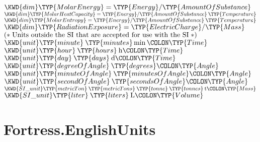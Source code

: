 \begin{Fortress}
\( \KWD{dim} \TYP{MolarEnergy} = \TYP{Energy} / \TYP{AmountOfSubstance}\)\\
\( \KWD{dim} \TYP{MolarHeatCapacity} = \TYP{Energy} / \TYP{AmountOfSubstance}\mskip 4mu plus 4mu\TYP{Temperature}\)\\
\( \KWD{dim} \TYP{MolarEntropy} = \TYP{Energy} / \TYP{AmountOfSubstance}\mskip 4mu plus 4mu\TYP{Temperature}\)\\
\( \KWD{dim} \TYP{RadiationExposure} = \TYP{ElectricCharge} / \TYP{Mass}\)\\[4pt]
\( \mathtt{(*}\;\hbox{\rm  Units outside the SI that are accepted for use with the SI \unskip}\;\mathtt{*)}\)\\[4pt]
\( \KWD{unit} \TYP{minute}\mskip 4mu plus 4mu\TYP{minutes} \min\COLON \TYP{Time} \)\\
\( \KWD{unit} \TYP{hour}\mskip 4mu plus 4mu\TYP{hours}\mskip 4mu plus 4mu\mathrm{h}\COLON \TYP{Time} \)\\
\( \KWD{unit} \TYP{day}\mskip 4mu plus 4mu\TYP{days}\mskip 4mu plus 4mu\mathrm{d}\COLON \TYP{Time} \)\\
\( \KWD{unit} \TYP{degreeOfAngle}\mskip 4mu plus 4mu\TYP{degrees}\COLON \TYP{Angle}  \)\\
\( \KWD{unit} \TYP{minuteOfAngle}\mskip 4mu plus 4mu\TYP{minutesOfAngle}\COLON \TYP{Angle} \)\\
\( \KWD{unit} \TYP{secondOfAngle}\mskip 4mu plus 4mu\TYP{secondsOfAngle}\COLON \TYP{Angle} \)\\
\( \KWD{SI{\char'137}unit} \TYP{metricTon}\mskip 4mu plus 4mu\TYP{metricTons}\mskip 4mu plus 4mu\TYP{tonne}\mskip 4mu plus 4mu\TYP{tonnes}\mskip 4mu plus 4mu\mathrm{t}\COLON \TYP{Mass} \)\\
\( \KWD{SI{\char'137}unit} \TYP{liter}\mskip 4mu plus 4mu\TYP{liters}\mskip 4mu plus 4mu\mathrm{L}\COLON \TYP{Volume} \)\-\\\poptabs
\end{Fortress}

\section{Fortress.EnglishUnits}



